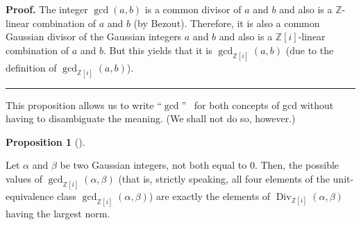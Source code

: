 \documentclass[numbers=enddot,12pt,final,onecolumn,notitlepage]{scrartcl}%
\numberwithin{exer}{subsection}
\theoremstyle{definition}
\newtheorem{prop}[theo]{Proposition}
\newenvironment{proposition}[1][]
{\begin{prop}[#1]\begin{leftbar}}
{\end{leftbar}\end{prop}}
\newenvironment{proof}[1][Proof]{\noindent\textbf{#1.} }{\ \rule{0.5em}{0.5em}}
\begin{document}
\begin{proof}
The integer $\gcd\left(  a,b\right)  $ is a common divisor of $a$ and $b$ and
also is a $\mathbb{Z}$-linear combination of $a$ and $b$ (by Bezout).
Therefore, it is also a common Gaussian divisor of the Gaussian integers $a$
and $b$ and also is a $\mathbb{Z}\left[  i\right]  $-linear combination of $a$
and $b$. But this yields that it is $\gcd\nolimits_{\mathbb{Z}\left[
i\right]  }\left(  a,b\right)  $ (due to the definition of $\gcd
\nolimits_{\mathbb{Z}\left[  i\right]  }\left(  a,b\right)  $).
\end{proof}

This proposition allows us to write \textquotedblleft$\gcd$\textquotedblright%
\ for both concepts of gcd without having to disambiguate the meaning. (We
shall not do so, however.)

\begin{proposition}
\label{prop.Z[i].gauss.gcd-as-max}Let $\alpha$ and $\beta$ be two Gaussian
integers, not both equal to $0$. Then, the possible values of $\gcd
\nolimits_{\mathbb{Z}\left[  i\right]  }\left(  \alpha,\beta\right)  $ (that
is, strictly speaking, all four elements of the unit-equivalence class
$\gcd\nolimits_{\mathbb{Z}\left[  i\right]  }\left(  \alpha,\beta\right)  $)
are exactly the elements of $\operatorname*{Div}\nolimits_{\mathbb{Z}\left[
i\right]  }\left(  \alpha,\beta\right)  $ having the largest norm.
\end{proposition}
\end{document}
